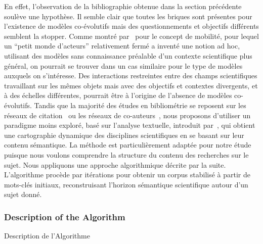 {En effet, l'observation de la bibliographie obtenue dans la section précédente soulève une hypothèse. Il semble clair que toutes les briques sont présentes pour l'existence de modèles co-évolutifs mais des questionnements et objectifs différents semblent la stopper. Comme montré par~\cite{commenges:tel-00923682} pour le concept de mobilité, pour lequel un ``petit monde d'acteurs'' relativement fermé a inventé une notion ad hoc, utilisant des modèles sans connaissance préalable d'un contexte scientifique plus général, on pourrait se trouver dans un cas similaire pour le type de modèles auxquels on s'intéresse. Des interactions restreintes entre des champs scientifiques travaillant sur les mêmes objets mais avec des objectifs et contextes divergents, et à des échelles différentes, pourrait être à l'origine de l'absence de modèles co-évolutifs.
Tandis que la majorité des études en bibliométrie se reposent sur les réseaux de citation~\cite{2013arXiv1310.8220N} ou les réseaux de co-auteurs~\cite{2014arXiv1402.7268S}, nous proposons d'utiliser un paradigme moins exploré, basé sur l'analyse textuelle, introduit par~\cite{chavalarias2013phylomemetic}, qui obtient une cartographie dynamique des disciplines scientifiques en se basant sur leur contenu sémantique. La méthode est particulièrement adaptée pour notre étude puisque nous voulons comprendre la structure du contenu des recherches sur le sujet. Nous appliquons une approche algorithmique décrite par la suite. L'algorithme procède par itérations pour obtenir un corpus stabilisé à partir de mots-clés initiaux, reconstruisant l'horizon sémantique scientifique autour d'un sujet donné.
}


\subsubsection{Description of the Algorithm}{Description de l'Algorithme}


